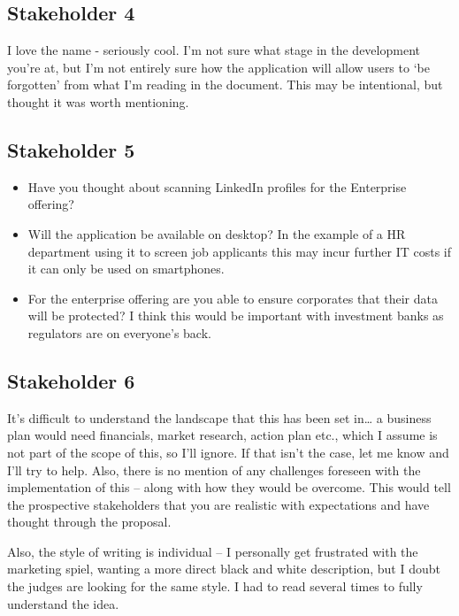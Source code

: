   \subsection{Stakeholder 4}

    I love the name - seriously cool. I'm not sure what stage in the development you're at, but I'm not entirely sure how the application will allow users to ‘be forgotten' from what I'm reading in the document. This may be intentional, but thought it was worth mentioning.

  \subsection{Stakeholder 5}

    \begin{itemize}
      \item Have you thought about scanning LinkedIn profiles for the Enterprise offering?
      \item Will the application be available on desktop? In the example of a HR department using it to screen job applicants this may incur further IT costs if it can only be used on smartphones.
      \item For the enterprise offering are you able to ensure corporates that their data will be protected? I think this would be important with investment banks as regulators are on everyone's back.
    \end{itemize}

  \subsection{Stakeholder 6}

    It's difficult to understand the landscape that this has been set in… a business plan would need financials, market research, action plan etc., which I assume is not part of the scope of this, so I'll ignore.  If that isn't the case, let me know and I'll try to help. Also, there is no mention of any challenges foreseen with the implementation of this – along with how they would be overcome.  This would tell the prospective stakeholders that you are realistic with expectations and have thought through the proposal.

    Also, the style of writing is individual – I personally get frustrated with the marketing spiel, wanting a more direct black and white description, but I doubt the judges are looking for the same style.  I had to read several times to fully understand the idea.

